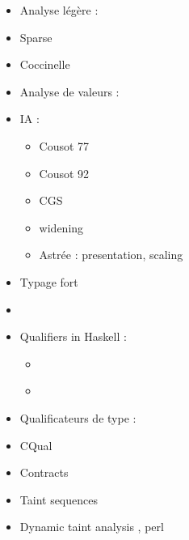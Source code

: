 \begin{itemize}
\item
  Analyse légère :
\item
  Sparse \cite{TorvaldsSparse}
\item
  Coccinelle \cite{coccinelle09} \cite{coccinelle11} 
\item
  Analyse de valeurs :
\item
  IA :
  \begin{itemize}
  \item
    Cousot 77 \cite{Cousot77}
  \item
    Cousot 92 \cite{Cousot92-1}
  \item
    CGS \cite{cgs}
  \item
    widening \cite{granger}
  \item
    Astrée : presentation\cite{Astree04,Astree05}, scaling \cite{AstreeScale}
  \end{itemize}
\item
  Typage fort
\item
  \cite{TAPL}
\item
  Qualifiers in Haskell :
  \begin{itemize}
  \item
    \cite{lightweight-static-capabilities}
  \item
    \cite{LZ06a}
  \end{itemize}
\item
  Qualificateurs de type :
\item
  CQual \cite{pldi99,usenix01,pldi02,cquk-usenix04,toplas-quals}
\item
  Contracts \cite{cssv}
\item
  Taint sequences \cite{mdv10}
\item
  Dynamic taint analysis \cite{oakland10}, perl
\end{itemize}

